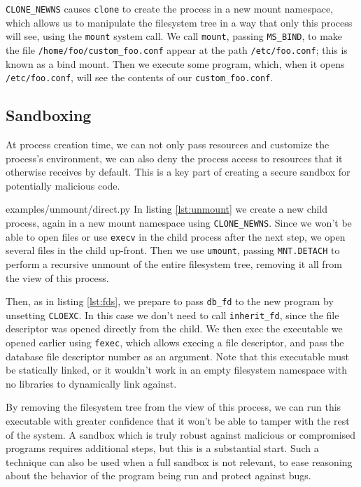 \documentclass[letterpaper,twocolumn,10pt]{article}
\begin{document}
\verb|CLONE_NEWNS| causes \texttt{clone} to create the process in a new mount namespace,
which allows us to manipulate the filesystem tree in a way that only this process will see,
using the \texttt{mount} system call.\cite{mount_namespaces}\cite{clone}
We call \texttt{mount}, passing \texttt{MS\_BIND}, to make the file \verb|/home/foo/custom_foo.conf|
appear at the path \verb|/etc/foo.conf|;
this is known as a bind mount.\cite{mount}
Then we execute some program,
which, when it opens \verb|/etc/foo.conf|, will see the contents of our \verb|custom_foo.conf|.
\subsection{Sandboxing}
At process creation time,
we can not only pass resources and customize the process's environment,
we can also deny the process access to resources that it otherwise receives by default.
This is a key part of creating a secure sandbox for potentially malicious code.\cite{seccomp}\cite{firejail}\cite{gvisor}


{examples/unmount/direct.py}
In listing \ref{lst:unmount}
we create a new child process,
again in a new mount namespace using \verb|CLONE_NEWNS|.
Since we won't be able to open files or use \texttt{execv} in the child process after the next step,
we open several files in the child up-front.
Then we use \texttt{umount},
passing \texttt{MNT.DETACH} to perform a recursive unmount of the entire filesystem tree,
removing it all from the view of this process.

Then, as in listing \ref{lst:fds}, we prepare to pass \texttt{db\_fd} to the new program by unsetting \texttt{CLOEXC}.
In this case we don't need to call \verb|inherit_fd|,
since the file descriptor was opened directly from the child.
We then exec the executable we opened earlier using \texttt{fexec},
which allows execing a file descriptor,
and pass the database file descriptor number as an argument.\cite{execveat}
Note that this executable must be statically linked,
or it wouldn't work in an empty filesystem namespace
with no libraries to dynamically link against.

By removing the filesystem tree from the view of this process,
we can run this executable with greater confidence
that it won't be able to tamper with the rest of the system.
A sandbox which is truly robust against malicious or compromised programs requires additional steps,
but this is a substantial start.\cite{firejail}\cite{gvisor}
Such a technique can also be used when a full sandbox is not relevant,
to ease reasoning about the behavior of the program being run
and protect against bugs.
\end{document}

